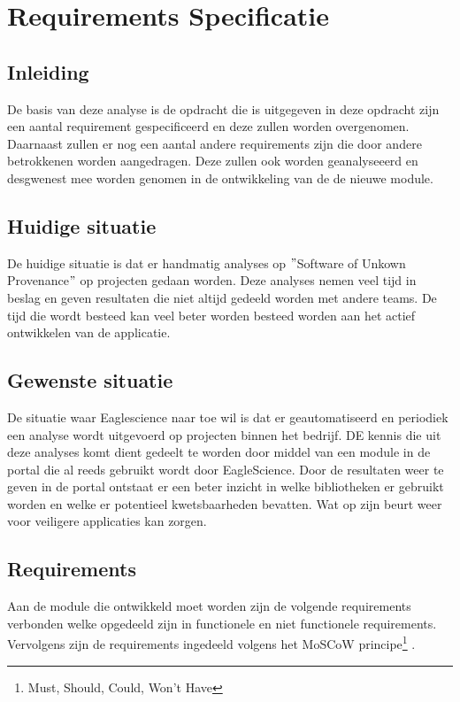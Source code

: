 
\chapter{Requirements Specificatie}\label{ch:requirements-specificatie}


\section{Inleiding}\label{sec:RS_inleiding}
De basis van deze analyse is de opdracht die is uitgegeven in deze opdracht zijn een aantal requirement gespecificeerd en deze zullen worden overgenomen. Daarnaast zullen er nog een aantal andere requirements zijn die door andere betrokkenen worden aangedragen. Deze zullen ook worden geanalyseeerd en desgwenest mee worden genomen in de ontwikkeling van de de nieuwe module.

\section{Huidige situatie}\label{sec:huidige-situatie}
De huidige situatie is dat er handmatig analyses op $"$Software of Unkown Provenance$"$ op projecten gedaan worden. Deze analyses nemen veel tijd in beslag en geven resultaten die niet altijd gedeeld worden met andere teams. De tijd die wordt besteed kan veel beter worden besteed worden aan het actief ontwikkelen van de applicatie.


\section{Gewenste situatie}\label{sec:gewenste-situatie}
De situatie waar Eaglescience naar toe wil is dat er geautomatiseerd en periodiek een analyse wordt uitgevoerd op projecten binnen het bedrijf. DE kennis die uit deze analyses komt dient gedeelt te worden door middel van een module in de portal die al reeds gebruikt wordt door EagleScience. Door de resultaten weer te geven in de portal ontstaat er een beter inzicht in welke bibliotheken er gebruikt worden en welke er potentieel kwetsbaarheden bevatten. Wat op zijn beurt weer voor veiligere applicaties kan zorgen.

\section{Requirements}\label{sec:requirements}
Aan de module die ontwikkeld moet worden zijn de volgende requirements verbonden welke opgedeeld zijn in functionele en niet functionele requirements. Vervolgens zijn de requirements ingedeeld volgens het MoSCoW principe\footnote{Must, Should, Could, Won't Have} .

